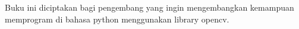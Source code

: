 Buku ini diciptakan bagi pengembang yang ingin mengembangkan kemampuan memprogram di bahasa python menggunakan library opencv.

